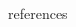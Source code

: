 \documentclass[10pt,
               svgnames,
               hyperref={colorlinks,citecolor=DeepPink4,linkcolor=FireBrick,urlcolor=Maroon},
               usepdftitle=false]{beamer}
\begin{document}
\begin{frame}{references}
\begin{columns}
\begin{column}{0.17\textwidth}
\vspace{20mm}
\end{column}
\end{columns}
\end{frame}
\end{document}
